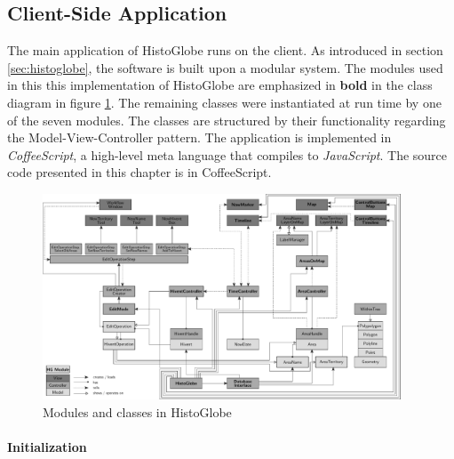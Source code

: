 

\subsection{Client-Side Application} %
\label{sub:client_side_application}

The main application of HistoGlobe runs on the client. As introduced in section \ref{sec:histoglobe}, the software is built upon a modular system. The modules used in this this implementation of HistoGlobe are emphasized in \textbf{bold} in the class diagram in figure \ref{fig:class_diagram}. The remaining classes were instantiated at run time by one of the seven modules. The classes are structured by their functionality regarding the Model-View-Controller pattern. The application is implemented in \emph{CoffeeScript}, a high-level meta language that compiles to \emph{JavaScript}. The source code presented in this chapter is in CoffeeScript.

\begin{figure}
  \centering
  \includegraphics[width=0.95\textwidth]{graphics/development/implementation/class_diagram}
  \vspace{1em}
  \caption{Modules and classes in HistoGlobe}
  \label{fig:class_diagram}
\end{figure}

\newpage %
\paragraph{Initialization} %
\label{par:initialization}

